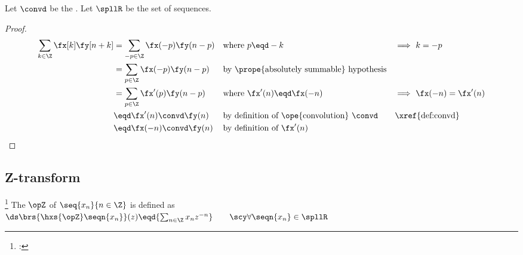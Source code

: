 \begin{proposition}
\label{prop:conv_knk}
Let $\convd$ be the  .
Let $\spllR$ be the set of  sequences. %
\end{proposition}
\begin{proof}
\begin{align*}
  \sum_{k\in\Z} \fx[k]\fy[n+k] 
    &= \sum_{-p\in\Z} \fx(-p)\fy(n-p) 
    && \text{where $p\eqd -k$}
    && \text{$\implies$ $k=-p$}
  \\&= \sum_{p\in\Z} \fx(-p)\fy(n-p) 
    && \text{by \prope{absolutely summable} hypothesis}
  \\&= \sum_{p\in\Z} \fx'(p)\fy(n-p) 
    && \text{where $\fx'(n) \eqd\fx(-n)$}
    && \text{$\implies$ $\fx(-n)=\fx'(n)$}
  \\&\eqd \fx'(n)\convd\fy(n)
    && \text{by definition of \ope{convolution} $\convd$}
    && \text{\xref{def:convd}}
  \\&\eqd \fx(-n)\convd\fy(n)
    && \text{by definition of $\fx'(n)$}
\end{align*}
\end{proof}

\subsection{Z-transform}
\begin{definition}
\footnote{
  : 
  }
\label{def:opZ}
  The  $\opZ$ of $\seq{x_n}{n\in\Z}$ is defined as
  \\\indentx
  $\ds\brs{\hxs{\opZ}\seqn{x_n}}(z) \eqd {\sum_{n\in\Z} x_n z^{-n}}\qquad\scy\forall\seqn{x_n}\in\spllR$
\end{definition}


